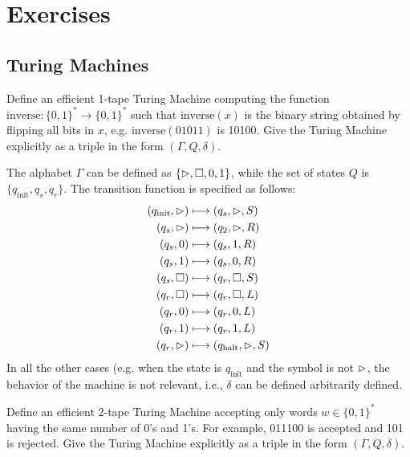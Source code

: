\chapter{Exercises}\label{ch:exercises}

\section{Turing Machines}

\begin{ex}
	Define an efficient 1-tape Turing Machine computing the function $\text{inverse}: \{0,1\}^* \to \{0,1\}^*$ such that $\text{inverse}(x)$ is the binary string obtained by flipping all bits in $x$, e.g. $\text{inverse}(01011)$ is 10100. Give the Turing Machine explicitly as a triple in the form $(\Gamma,Q,\delta)$.
\end{ex}

\begin{solution}
	The alphabet $\Gamma$ can be defined as $\{\rhd,\square,0,1\}$, while the set of states $Q$ is $\{q_{\text{init}}, q_s, q_r\}$. The transition function is specified as follows:
	\begin{align*}
		(q_{\text{init}},\rhd) & \longmapsto (q_s,\rhd,S)             \\
		(q_s,\rhd)             & \longmapsto (q_2,\rhd,R)             \\
		(q_s,0)                  & \longmapsto (q_s,1,R)                  \\
		(q_s,1)                  & \longmapsto (q_s,0,R)                  \\
		(q_s,\square)             & \longmapsto (q_r,\square,S)             \\
		(q_r,\square)             & \longmapsto (q_r,\square,L)             \\
		(q_r,0)                  & \longmapsto (q_r,0,L)                  \\
		(q_r,1)                  & \longmapsto (q_r,1,L)                  \\
		(q_r,\rhd)             & \longmapsto (q_{\text{halt}},\rhd,S)
	\end{align*}
	In all the other cases (e.g. when the state is $q_{\text{init}}$ and the symbol is not $\rhd$, the behavior of the machine is not relevant, i.e., $\delta$ can be defined arbitrarily defined.
\end{solution}

\begin{ex}
	Define an efficient 2-tape Turing Machine accepting only words $w \in \{0,1\}^*$ having the same number of 0's and 1's. For example, 011100 is accepted and 101 is rejected. Give the Turing Machine explicitly as a triple in the form $(\Gamma,Q,\delta)$.
\end{ex}


